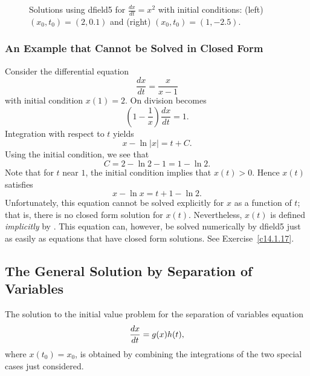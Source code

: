 \begin{figure}[htb]
           \centerline{%
	   }
           \caption{Solutions using {\sf dfield5} for $\frac{dx}{dt} = x^2$ 
		with initial conditions: (left) $(x_0,t_0)=(2,0.1)$ and 
		(right) $(x_0,t_0)=(1,-2.5)$.}
           \label{F:x^2}
\end{figure}

\subsubsection*{An Example that Cannot be Solved in Closed Form}

Consider the differential equation
\begin{equation}  \label{E:ncf}
\frac{dx}{dt} = \frac{x}{x-1}
\end{equation}
with initial condition $x(1)=2$. On division  becomes 
\[
\left(1-\frac{1}{x}\right)\frac{dx}{dt} = 1.
\]
Integration with respect to $t$ yields
\[
x - \ln|x| = t + C.
\]
Using the initial condition, we see that 
\[
C = 2 - \ln 2 -1 = 1 - \ln 2.
\]
Note that for $t$ near $1$, the initial condition implies that $x(t)>0$.  
Hence $x(t)$ satisfies
\begin{equation} \label{e:solnncf}
x -\ln x = t + 1 - \ln 2.
\end{equation}
Unfortunately, this equation cannot be solved explicitly for $x$ 
as a function of $t$; that is, there is no closed form 
solution 
for $x(t)$.  Nevertheless, $x(t)$ is defined 
{\em implicitly\/} 
by .  This equation can, however, be solved numerically by
{\sf dfield5} just as easily as equations that have closed form solutions.
See Exercise~\ref{c14.1.17}. 

\subsection*{The General Solution by Separation of Variables}

The solution to the initial value problem for the separation
of variables equation
\begin{equation}  \label{eq:ghivp}
\displaystyle \frac{dx}{dt} =  g(x) h(t),
\end{equation}
where $x(t_0) = x_0$, is obtained by combining the integrations of the two 
special cases just considered.  


